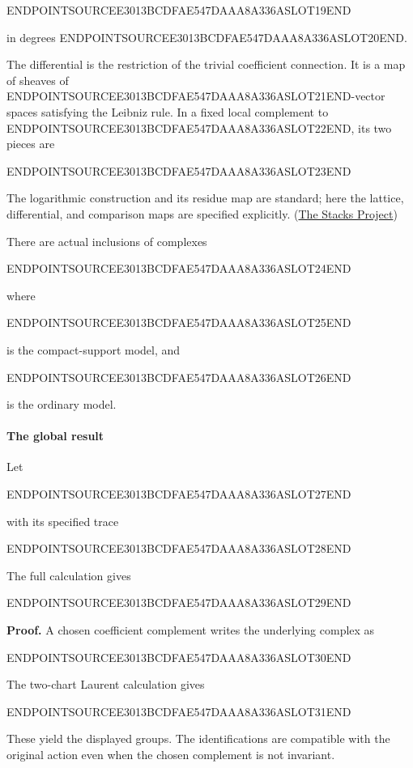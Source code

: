 ENDPOINTSOURCEE3013BCDFAE547DAAA8A336ASLOT19END

in degrees ENDPOINTSOURCEE3013BCDFAE547DAAA8A336ASLOT20END.

The differential is the restriction of the trivial coefficient connection. It is a map of sheaves of ENDPOINTSOURCEE3013BCDFAE547DAAA8A336ASLOT21END-vector spaces satisfying the Leibniz rule. In a fixed local complement to ENDPOINTSOURCEE3013BCDFAE547DAAA8A336ASLOT22END, its two pieces are

ENDPOINTSOURCEE3013BCDFAE547DAAA8A336ASLOT23END

The logarithmic construction and its residue map are standard; here the lattice, differential, and comparison maps are specified explicitly. (\href{https://stacks.math.columbia.edu/tag/0FMU}{The Stacks Project})

There are actual inclusions of complexes

ENDPOINTSOURCEE3013BCDFAE547DAAA8A336ASLOT24END

where

ENDPOINTSOURCEE3013BCDFAE547DAAA8A336ASLOT25END

is the compact-support model, and

ENDPOINTSOURCEE3013BCDFAE547DAAA8A336ASLOT26END

is the ordinary model.

\paragraph{The global result}\label{endpoint-exponential_constituent_original--the-global-result}

Let

ENDPOINTSOURCEE3013BCDFAE547DAAA8A336ASLOT27END

with its specified trace

ENDPOINTSOURCEE3013BCDFAE547DAAA8A336ASLOT28END

The full calculation gives

ENDPOINTSOURCEE3013BCDFAE547DAAA8A336ASLOT29END

\textbf{Proof.} A chosen coefficient complement writes the underlying complex as

ENDPOINTSOURCEE3013BCDFAE547DAAA8A336ASLOT30END

The two-chart Laurent calculation gives

ENDPOINTSOURCEE3013BCDFAE547DAAA8A336ASLOT31END

These yield the displayed groups. The identifications are compatible with the original action even when the chosen complement is not invariant.

